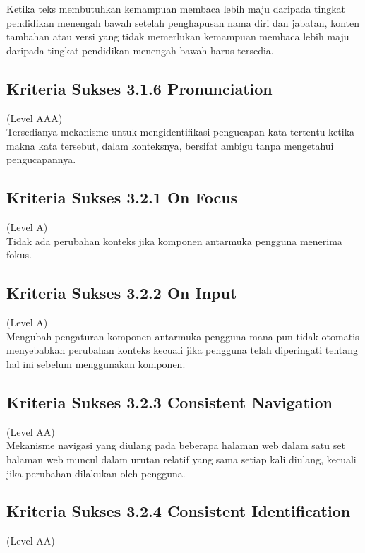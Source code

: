 Ketika teks membutuhkan kemampuan membaca lebih maju daripada tingkat pendidikan menengah bawah setelah penghapusan nama diri dan jabatan, konten tambahan atau versi yang tidak memerlukan kemampuan membaca lebih maju daripada tingkat pendidikan menengah bawah harus tersedia.

\subsection{Kriteria Sukses 3.1.6 Pronunciation}
\label{subsec:kriteria_3.1.6}
(Level AAA) \\

Tersedianya mekanisme untuk mengidentifikasi pengucapan kata tertentu ketika makna kata tersebut, dalam konteksnya, bersifat ambigu tanpa mengetahui pengucapannya.

\subsection{Kriteria Sukses 3.2.1 On Focus}
\label{subsec:kriteria_3.2.1}
(Level A) \\

Tidak ada perubahan konteks jika komponen antarmuka pengguna menerima fokus.

\subsection{Kriteria Sukses 3.2.2 On Input}
\label{subsec:kriteria_3.2.2}
(Level A) \\

Mengubah pengaturan komponen antarmuka pengguna mana pun tidak otomatis menyebabkan perubahan konteks kecuali jika pengguna telah diperingati tentang hal ini sebelum menggunakan komponen.

\subsection{Kriteria Sukses 3.2.3 Consistent Navigation}
\label{subsec:kriteria_3.2.3}
(Level AA) \\

Mekanisme navigasi yang diulang pada beberapa halaman web dalam satu set halaman web muncul dalam urutan relatif yang sama setiap kali diulang, kecuali jika perubahan dilakukan oleh pengguna.

\subsection{Kriteria Sukses 3.2.4 Consistent Identification}
\label{subsec:kriteria_3.2.4}
(Level AA) \\

